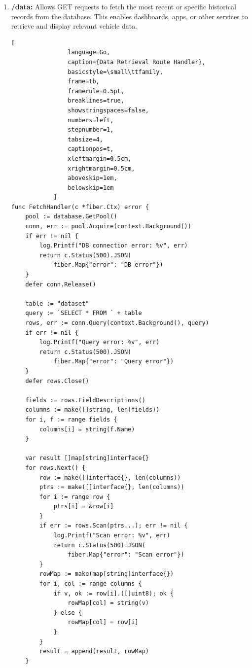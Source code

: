 \begin{enumerate}
\begin{lstlisting}
    for _, rec := range records {
        conn.Exec(
            context.Background(),
            insert,
            toIfaceSlice(rec)...,
        )
    }
    return c.SendStatus(200)
}
            \end{lstlisting}
        \item \textbf{/data:} 
            Allows GET requests to fetch the most recent or specific historical records from the database. This enables dashboards, apps, or other services to retrieve and display relevant vehicle data.
            \begin{lstlisting}[
                language=Go, 
                caption={Data Retrieval Route Handler},
                basicstyle=\small\ttfamily,
                frame=tb,
                framerule=0.5pt,
                breaklines=true,
                showstringspaces=false,
                numbers=left,
                stepnumber=1,
                tabsize=4,
                captionpos=t,
                xleftmargin=0.5cm,
                xrightmargin=0.5cm,
                aboveskip=1em,
                belowskip=1em
            ]
func FetchHandler(c *fiber.Ctx) error {
    pool := database.GetPool()
    conn, err := pool.Acquire(context.Background())
    if err != nil {
        log.Printf("DB connection error: %v", err)
        return c.Status(500).JSON(
            fiber.Map{"error": "DB error"})
    }
    defer conn.Release()

    table := "dataset"
    query := `SELECT * FROM ` + table
    rows, err := conn.Query(context.Background(), query)
    if err != nil {
        log.Printf("Query error: %v", err)
        return c.Status(500).JSON(
            fiber.Map{"error": "Query error"})
    }
    defer rows.Close()

    fields := rows.FieldDescriptions()
    columns := make([]string, len(fields))
    for i, f := range fields {
        columns[i] = string(f.Name)
    }

    var result []map[string]interface{}
    for rows.Next() {
        row := make([]interface{}, len(columns))
        ptrs := make([]interface{}, len(columns))
        for i := range row {
            ptrs[i] = &row[i]
        }
        if err := rows.Scan(ptrs...); err != nil {
            log.Printf("Scan error: %v", err)
            return c.Status(500).JSON(
                fiber.Map{"error": "Scan error"})
        }
        rowMap := make(map[string]interface{})
        for i, col := range columns {
            if v, ok := row[i].([]uint8); ok {
                rowMap[col] = string(v)
            } else {
                rowMap[col] = row[i]
            }
        }
        result = append(result, rowMap)
    }


\end{lstlisting}
\end{enumerate}
